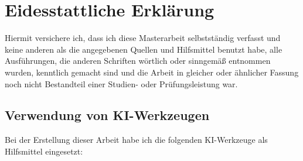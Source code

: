\chapter*{Eidesstattliche Erklärung}
\thispagestyle{empty}\enlargethispage{4\baselineskip}%

Hiermit versichere ich, dass ich diese Masterarbeit selbstständig verfasst und
keine anderen als die angegebenen Quellen und Hilfsmittel benutzt habe, alle
Ausführungen, die anderen Schriften wörtlich oder sinngemäß entnommen wurden,
kenntlich gemacht sind und die Arbeit in gleicher oder ähnlicher Fassung noch
nicht Bestandteil einer Studien- oder Prüfungsleistung war.

\section*{Verwendung von KI-Werkzeugen}
Bei der Erstellung dieser Arbeit habe ich die folgenden KI-Werkzeuge als
Hilfsmittel eingesetzt:

